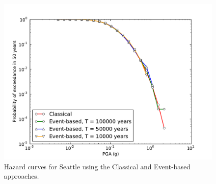 \begin{figure}
\centering
\includegraphics[width=14cm]{./Pictures/Seattle.pdf}
\caption{Hazard curves for Seattle using the Classical and Event-based approaches.}
\label{fig:seattle_curves}
\end{figure}

